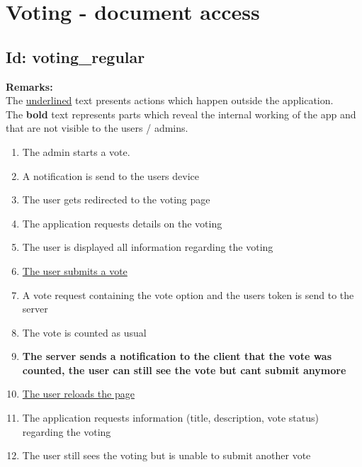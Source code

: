 \documentclass{article}
\begin{document}
\section*{Voting - document access}
\subsection*{Id: voting\_regular}
\noindent
\textbf{Remarks:}\\
 The \underline{underlined} text presents actions which happen outside the application. \\
 The \textbf{bold} text represents parts which reveal the internal working of the app and that are not visible to the users / admins.
\begin{enumerate}
	\item The admin starts a vote.
	\item A notification is send to the users device
	\item The user gets redirected to the voting page
	\item The application requests details on the voting
	\item The user is displayed all information regarding the voting
	\item \underline{The user submits a vote}
	\item A vote request containing the vote option and the users token is send to the server
	\item The vote is counted as usual
	\item \textbf{The server sends a notification to the client that the vote was counted, the user can still see the vote but cant submit anymore}
	\item \underline{The user reloads the page}
	\item The application requests information (title, description, vote status) regarding the voting
	\item The user still sees the voting but is unable to submit another vote
	
\end{enumerate}
\end{document}
